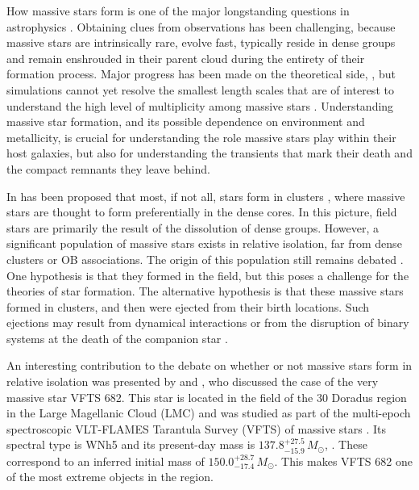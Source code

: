 \documentclass[apjl,twocolumn]{emulateapj}
\newcommand{\todo}[1]{{\large $\blacksquare$~\textbf{\color{red}[#1]}}~$\blacksquare$}
\begin{document}
How massive stars form is one of the major longstanding questions in astrophysics
\citep[e.g.,][]{zinnecker:07}. Obtaining clues from observations has been challenging, because massive stars are intrinsically rare, 
evolve fast, typically reside in dense groups and remain enshrouded in
their parent cloud during the entirety of their formation
process. Major progress has been made on the theoretical side,
\citep[e.g.][]{kuiper:15,rosen:16}, but simulations cannot yet resolve
the smallest length scales that are of interest to understand the 
high level of multiplicity among massive stars  \citep[e.g.,][]{bate:09, sana:17}. Understanding massive star formation, and its
possible dependence on environment and metallicity, is crucial for
understanding the role massive stars play within their host galaxies,
but also for understanding the transients that
mark their death and the compact remnants they leave behind. %

In has been proposed that most, if not all, stars form in clusters
\citep{lada:03}, where massive stars are thought to  form
preferentially in the dense cores. In this picture, field stars are primarily the result of the dissolution of dense groups. 
However, a significant population of massive stars exists in relative
isolation,  far from dense clusters or OB associations. The origin of
this population still remains debated \citep{gvaramadze:12, lamb:16,ward:18}.  One
hypothesis is that they  formed in the field, but this poses a
challenge for the theories of star formation. The alternative
hypothesis is that these massive stars formed in clusters, and then
were ejected from their birth locations. Such ejections may result
from dynamical interactions \citep[e.g.,][]{poveda:67} or from the
disruption of binary systems at the death of the companion %
star \citep[e.g.,][]{zwicky:57, blaauw:61, renzo:18}. 

An interesting contribution to the debate on whether or not massive
stars form in relative isolation was presented by
\cite{bestenlehner:11} and \cite{bressert:12}, who discussed the case of the very massive star
VFTS 682.  This star is located in the field of the 30 Doradus region
in the Large Magellanic Cloud (LMC) and was studied as part of the
multi-epoch spectroscopic VLT-FLAMES Tarantula Survey (VFTS) of
massive stars \citep{evans:11}. Its spectral type is WNh5 and its 
present-day mass is $137.8^{+27.5}_{-15.9}\,M_\odot$,
\citep{schneider:18}. These correspond to an inferred initial mass of
$150.0^{+28.7}_{-17.4}\,M_\odot$. This makes VFTS 682 one of the
most extreme objects in the region.
\end{document}
